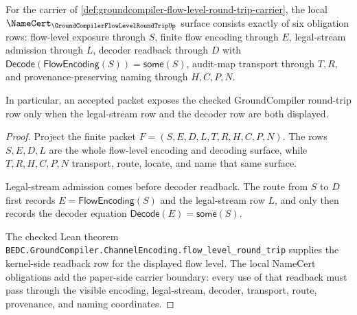 \begin{theorem}
\label{thm:groundcompiler-flow-level-round-trip-namecert-obligations}
For the carrier of \autoref{def:groundcompiler-flow-level-round-trip-carrier}, the local $\NameCert_{\GroundCompilerFlowLevelRoundTripUp}$ surface consists exactly of six obligation rows: flow-level exposure through $S$, finite flow encoding through $E$, legal-stream admission through $L$, decoder readback through $D$ with $\mathsf{Decode}(\mathsf{FlowEncoding}(S))=\mathsf{some}(S)$, audit-map transport through $T,R$, and provenance-preserving naming through $H,C,P,N$.

In particular, an accepted packet exposes the checked GroundCompiler round-trip row only when the legal-stream row and the decoder row are both displayed.
\end{theorem}
\begin{proof}
Project the finite packet $F=(S,E,D,L,T,R,H,C,P,N)$. The rows $S,E,D,L$ are the whole flow-level encoding and decoding surface, while $T,R,H,C,P,N$ transport, route, locate, and name that same surface.

Legal-stream admission comes before decoder readback. The route from $S$ to $D$ first records $E=\mathsf{FlowEncoding}(S)$ and the legal-stream row $L$, and only then records the decoder equation $\mathsf{Decode}(E)=\mathsf{some}(S)$.

The checked Lean theorem \texttt{BEDC.GroundCompiler.ChannelEncoding.flow\_level\_round\_trip} supplies the kernel-side readback row for the displayed flow level. The local NameCert obligations add the paper-side carrier boundary: every use of that readback must pass through the visible encoding, legal-stream, decoder, transport, route, provenance, and naming coordinates.
\end{proof}

